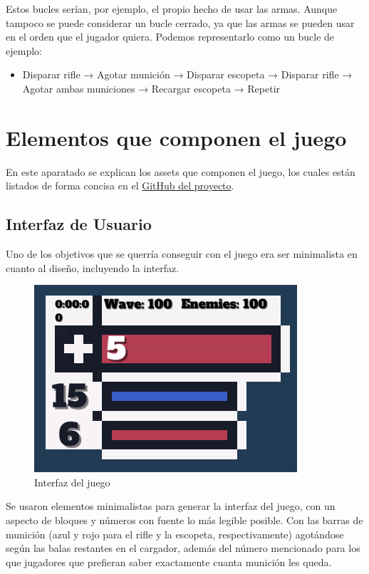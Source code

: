 \documentclass[12pt]{article}
\begin{document}
        Estos bucles serían, por ejemplo, el propio hecho de usar las armas. Aunque tampoco se puede considerar un bucle cerrado, ya que las armas se pueden usar en el orden que el jugador quiera. Podemos representarlo como un bucle de ejemplo: 
        \begin{itemize}
            \item Disparar rifle → Agotar munición → Disparar escopeta → Disparar rifle → Agotar ambas municiones → Recargar escopeta → Repetir
        \end{itemize}
\newpage
\section{Elementos que componen el juego}
    En este aparatado se explican los assets que componen el juego, los cuales están listados de forma concisa en el \href{https://github.com/JesusJMUJI/TopDownShooterGame}{GitHub del proyecto}. 
    
    \subsection{Interfaz de Usuario}
        Uno de los objetivos que se querría conseguir con el juego era ser minimalista en cuanto al diseño, incluyendo la interfaz.  
        \begin{figure}[H]
            \centering
            \includegraphics[scale = 0.7]{Images/UI.png}
            \caption{Interfaz del juego}
            \label{fig:UI}
        \end{figure}
        
        Se usaron elementos minimalistas para generar la interfaz del juego, con un aspecto de bloques y números con fuente lo más legible posible. Con las barras de munición (azul y rojo para el rifle y la escopeta, respectivamente) agotándose según las balas restantes en el cargador, además del número mencionado para los que jugadores que prefieran saber exactamente cuanta munición les queda.
        
\end{document}
